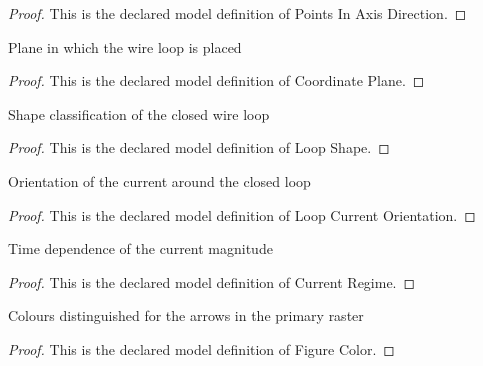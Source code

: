 \begin{proof}
  This is the declared model definition of Points In Axis Direction.
\end{proof}
\begin{definition}
  \label{def:physics:phyx-mini-0952:phyxminiproblems-problemphyxmini0952-coordinateplane}
  Plane in which the wire loop is placed
\end{definition}
\begin{proof}
  This is the declared model definition of Coordinate Plane.
\end{proof}
\begin{definition}
  \label{def:physics:phyx-mini-0952:phyxminiproblems-problemphyxmini0952-loopshape}
  Shape classification of the closed wire loop
\end{definition}
\begin{proof}
  This is the declared model definition of Loop Shape.
\end{proof}
\begin{definition}
  \label{def:physics:phyx-mini-0952:phyxminiproblems-problemphyxmini0952-loopcurrentorientation}
  Orientation of the current around the closed loop
\end{definition}
\begin{proof}
  This is the declared model definition of Loop Current Orientation.
\end{proof}
\begin{definition}
  \label{def:physics:phyx-mini-0952:phyxminiproblems-problemphyxmini0952-currentregime}
  Time dependence of the current magnitude
\end{definition}
\begin{proof}
  This is the declared model definition of Current Regime.
\end{proof}
\begin{definition}
  \label{def:physics:phyx-mini-0952:phyxminiproblems-problemphyxmini0952-figurecolor}
  Colours distinguished for the arrows in the primary raster
\end{definition}
\begin{proof}
  This is the declared model definition of Figure Color.
\end{proof}
